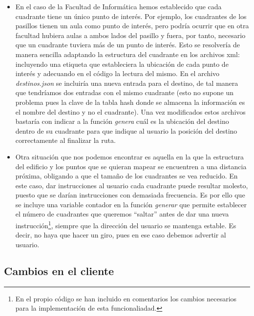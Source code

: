 \begin{itemize}
	\item En el caso de la Facultad de Informática hemos establecido que cada cuadrante tiene un único punto de interés. Por ejemplo, los cuadrantes de los pasillos tienen un aula como punto de interés, pero podría ocurrir que en otra facultad hubiera aulas a ambos lados del pasillo y fuera, por tanto, necesario que un cuadrante tuviera más de un punto de interés. Esto se resolvería de manera sencilla adaptando la estructura del cuadrante en los archivos xml: incluyendo una etiqueta que estableciera la ubicación de cada punto de interés y adecuando en el código la lectura del mismo. En el archivo \textit{destinos.json} se incluiría una nueva entrada para el destino, de tal manera que tendríamos dos entradas con el mismo cuadrante (esto no supone un problema pues la clave de la tabla hash donde se almacena la información es el nombre del destino y no el cuadrante). Una vez modificados estos archivos bastaría con indicar a la función \textit{genera} cuál es la ubicación del destino dentro de su cuadrante para que indique al usuario la posición del destino correctamente al finalizar la ruta.
	
	\item Otra situación que nos podemos encontrar es aquella en la que la estructura del edificio y los puntos que se quieran mapear se encuentren a una distancia próxima, obligando a que el tamaño de los cuadrantes se vea reducido. En este caso, dar instrucciones al usuario cada cuadrante puede resultar molesto, puesto que se darían instrucciones con demasiada frecuencia. Es por ello que se incluye una variable contador en la función \textit{generar} que permite establecer el número de cuadrantes que queremos ``saltar'' antes de dar una nueva instrucción\footnote{En el propio código se han incluido en comentarios los cambios necesarios para la implementación de esta funcionaliadad.}, siempre que la dirección del usuario se mantenga estable. Es decir, no haya que hacer un giro, pues en ese caso debemos advertir al usuario.
\end{itemize}




\subsection{Cambios en el cliente}

